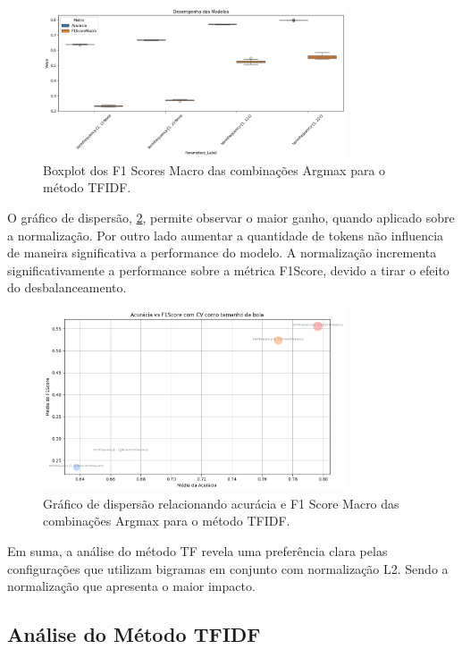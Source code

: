 \begin{figure}[H]
    \centering
    \includegraphics[width=0.8\textwidth]{images/boxtf.png}
    \caption{Boxplot dos F1 Scores Macro das combinações Argmax para o método TFIDF.}
    \label{fig:boxplot_tf}
\end{figure}

O gráfico de dispersão, \ref{fig:scatter_tf}, permite observar o maior ganho, quando aplicado sobre a normalização. 
 Por outro lado aumentar a quantidade de tokens não influencia de maneira significativa a performance do modelo.  A normalização incrementa significativamente a performance sobre a métrica F1Score, devido a tirar o efeito do desbalanceamento.  

\begin{figure}[H]
    \centering
    \includegraphics[width=0.8\textwidth]{images/dispersaotf.png}
    \caption{Gráfico de dispersão relacionando acurácia e F1 Score Macro das combinações Argmax para o método TFIDF.}
    \label{fig:scatter_tf}
\end{figure}

Em suma, a análise do método TF revela uma preferência clara pelas configurações que utilizam bigramas em conjunto com normalização L2. Sendo a normalização que apresenta o maior impacto.


\subsection{Análise do Método TFIDF}

